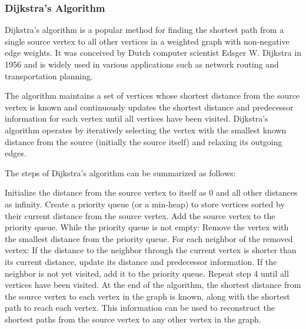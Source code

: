 \documentclass[12pt]{book} %
\begin{document}
\subsubsection{Dijkstra's Algorithm}
Dijkstra's algorithm is a popular method for finding the shortest path from a single source vertex to all other vertices in a weighted graph with non-negative edge weights. It was conceived by Dutch computer scientist Edsger W. Dijkstra in 1956 and is widely used in various applications such as network routing and transportation planning.

The algorithm maintains a set of vertices whose shortest distance from the source vertex is known and continuously updates the shortest distance and predecessor information for each vertex until all vertices have been visited. Dijkstra's algorithm operates by iteratively selecting the vertex with the smallest known distance from the source (initially the source itself) and relaxing its outgoing edges.

The steps of Dijkstra's algorithm can be summarized as follows:

Initialize the distance from the source vertex to itself as 0 and all other distances as infinity.
Create a priority queue (or a min-heap) to store vertices sorted by their current distance from the source vertex.
Add the source vertex to the priority queue.
While the priority queue is not empty:
Remove the vertex with the smallest distance from the priority queue.
For each neighbor of the removed vertex:
If the distance to the neighbor through the current vertex is shorter than its current distance, update its distance and predecessor information.
If the neighbor is not yet visited, add it to the priority queue.
Repeat step 4 until all vertices have been visited.
At the end of the algorithm, the shortest distance from the source vertex to each vertex in the graph is known, along with the shortest path to reach each vertex. This information can be used to reconstruct the shortest paths from the source vertex to any other vertex in the graph.
\end{document}
